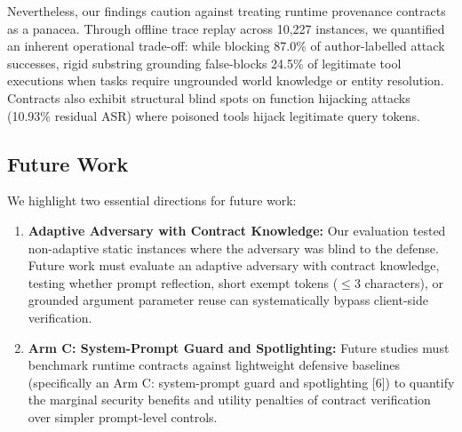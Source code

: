 \documentclass[11pt,letterpaper]{article}
\begin{document}
Nevertheless, our findings caution against treating runtime provenance contracts as a panacea. Through offline trace replay across 10,227 instances, we quantified an inherent operational trade-off: while blocking 87.0\% of author-labelled attack successes, rigid substring grounding false-blocks 24.5\% of legitimate tool executions when tasks require ungrounded world knowledge or entity resolution. Contracts also exhibit structural blind spots on function hijacking attacks (10.93\% residual ASR) where poisoned tools hijack legitimate query tokens.

\subsection*{Future Work}

We highlight two essential directions for future work:
\begin{enumerate}
\item[1.] \textbf{Adaptive Adversary with Contract Knowledge:} Our evaluation tested non-adaptive static instances where the adversary was blind to the defense. Future work must evaluate an adaptive adversary with contract knowledge, testing whether prompt reflection, short exempt tokens ($\le 3$ characters), or grounded argument parameter reuse can systematically bypass client-side verification.
\item[2.] \textbf{Arm C: System-Prompt Guard and Spotlighting:} Future studies must benchmark runtime contracts against lightweight defensive baselines (specifically an Arm C: system-prompt guard and spotlighting [6]) to quantify the marginal security benefits and utility penalties of contract verification over simpler prompt-level controls.
\end{enumerate}
\end{document}

